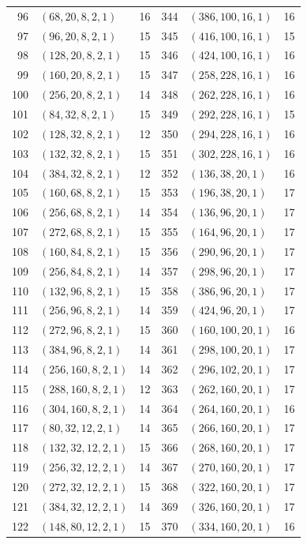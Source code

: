 \begin{longtable}{@{}rlr@{\hspace{12mm}}rlr@{}}
96 & $(68,20,8,2,1)$ & 16 & 344 & $(386,100,16,1)$ & 16\\
97 & $(96,20,8,2,1)$ & 15 & 345 & $(416,100,16,1)$ & 15\\
98 & $(128,20,8,2,1)$ & 15 & 346 & $(424,100,16,1)$ & 16\\
99 & $(160,20,8,2,1)$ & 15 & 347 & $(258,228,16,1)$ & 16\\
100 & $(256,20,8,2,1)$ & 14 & 348 & $(262,228,16,1)$ & 16\\
101 & $(84,32,8,2,1)$ & 15 & 349 & $(292,228,16,1)$ & 15\\
102 & $(128,32,8,2,1)$ & 12 & 350 & $(294,228,16,1)$ & 16\\
103 & $(132,32,8,2,1)$ & 15 & 351 & $(302,228,16,1)$ & 16\\
104 & $(384,32,8,2,1)$ & 12 & 352 & $(136,38,20,1)$ & 16\\
105 & $(160,68,8,2,1)$ & 15 & 353 & $(196,38,20,1)$ & 17\\
106 & $(256,68,8,2,1)$ & 14 & 354 & $(136,96,20,1)$ & 17\\
107 & $(272,68,8,2,1)$ & 15 & 355 & $(164,96,20,1)$ & 17\\
108 & $(160,84,8,2,1)$ & 15 & 356 & $(290,96,20,1)$ & 17\\
109 & $(256,84,8,2,1)$ & 14 & 357 & $(298,96,20,1)$ & 17\\
110 & $(132,96,8,2,1)$ & 15 & 358 & $(386,96,20,1)$ & 17\\
111 & $(256,96,8,2,1)$ & 14 & 359 & $(424,96,20,1)$ & 17\\
112 & $(272,96,8,2,1)$ & 15 & 360 & $(160,100,20,1)$ & 16\\
113 & $(384,96,8,2,1)$ & 14 & 361 & $(298,100,20,1)$ & 17\\
114 & $(256,160,8,2,1)$ & 14 & 362 & $(296,102,20,1)$ & 17\\
115 & $(288,160,8,2,1)$ & 12 & 363 & $(262,160,20,1)$ & 17\\
116 & $(304,160,8,2,1)$ & 14 & 364 & $(264,160,20,1)$ & 16\\
117 & $(80,32,12,2,1)$ & 14 & 365 & $(266,160,20,1)$ & 17\\
118 & $(132,32,12,2,1)$ & 15 & 366 & $(268,160,20,1)$ & 17\\
119 & $(256,32,12,2,1)$ & 14 & 367 & $(270,160,20,1)$ & 17\\
120 & $(272,32,12,2,1)$ & 15 & 368 & $(322,160,20,1)$ & 17\\
121 & $(384,32,12,2,1)$ & 14 & 369 & $(326,160,20,1)$ & 17\\
122 & $(148,80,12,2,1)$ & 15 & 370 & $(334,160,20,1)$ & 16\\

\end{longtable}
